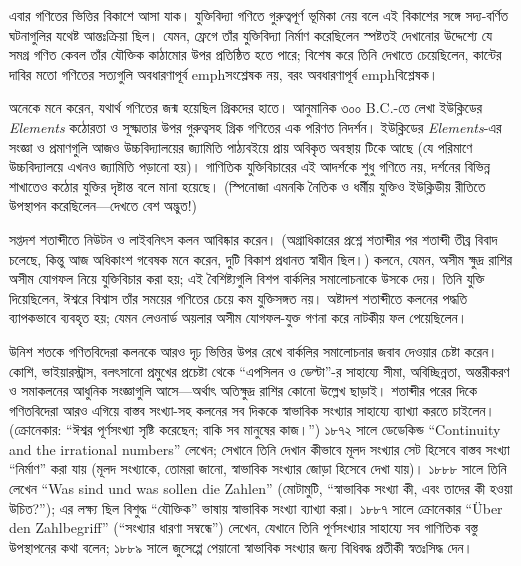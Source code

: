 \documentclass[../../../include/open-logic-section]{subfiles}
\begin{document}
এবার গণিতের ভিত্তির বিকাশে আসা যাক। যুক্তিবিদ্যা গণিতে গুরুত্বপূর্ণ ভূমিকা
নেয় বলে এই বিকাশের সঙ্গে সদ্য-বর্ণিত ঘটনাগুলির যথেষ্ট আন্তঃক্রিয়া ছিল। যেমন,
ফ্রেগে তাঁর যুক্তিবিদ্যা নির্মাণ করেছিলেন স্পষ্টতই দেখানোর উদ্দেশ্যে যে সমগ্র
গণিত কেবল তাঁর যৌক্তিক কাঠামোর উপর প্রতিষ্ঠিত হতে পারে; বিশেষ করে তিনি দেখাতে
চেয়েছিলেন, কান্টের দাবির মতো গণিতের সত্যগুলি অবধারণাপূর্ব emph{সংশ্লেষক}
নয়, বরং অবধারণাপূর্ব emph{বিশ্লেষক}।

অনেকে মনে করেন, যথার্থ গণিতের জন্ম হয়েছিল গ্রিকদের হাতে। আনুমানিক ৩০০
B.C.-তে লেখা ইউক্লিডের \emph{Elements} কঠোরতা ও সূক্ষ্মতার উপর গুরুত্বসহ
গ্রিক গণিতের এক পরিণত নিদর্শন। ইউক্লিডের \emph{Elements}-এর সংজ্ঞা ও
প্রমাণগুলি আজও উচ্চবিদ্যালয়ের জ্যামিতি পাঠ্যবইয়ে প্রায় অবিকৃত অবস্থায় টিকে
আছে (যে পরিমাণে উচ্চবিদ্যালয়ে এখনও জ্যামিতি পড়ানো হয়)। গাণিতিক যুক্তিবিচারের
এই আদর্শকে শুধু গণিতে নয়, দর্শনের বিভিন্ন শাখাতেও কঠোর যুক্তির দৃষ্টান্ত বলে
মানা হয়েছে। (স্পিনোজা এমনকি নৈতিক ও ধর্মীয় যুক্তিও ইউক্লিডীয় রীতিতে
উপস্থাপন করেছিলেন—দেখতে বেশ অদ্ভুত!)

সপ্তদশ শতাব্দীতে নিউটন ও লাইবনিৎস কলন আবিষ্কার করেন। (অগ্রাধিকারের প্রশ্নে
শতাব্দীর পর শতাব্দী তীব্র বিবাদ চলেছে, কিন্তু আজ অধিকাংশ গবেষক মনে করেন,
দুটি বিকাশ প্রধানত স্বাধীন ছিল।) কলনে, যেমন, অসীম ক্ষুদ্র রাশির অসীম যোগফল
নিয়ে যুক্তিবিচার করা হয়; এই বৈশিষ্ট্যগুলি বিশপ বার্কলির সমালোচনাকে উসকে দেয়।
তিনি যুক্তি দিয়েছিলেন, ঈশ্বরে বিশ্বাস তাঁর সময়ের গণিতের চেয়ে কম যুক্তিসঙ্গত
নয়। অষ্টাদশ শতাব্দীতে কলনের পদ্ধতি ব্যাপকভাবে ব্যবহৃত হয়; যেমন লেওনার্ড
অয়লার অসীম যোগফল-যুক্ত গণনা করে নাটকীয় ফল পেয়েছিলেন।

উনিশ শতকে গণিতবিদেরা কলনকে আরও দৃঢ় ভিত্তির উপর রেখে বার্কলির সমালোচনার
জবাব দেওয়ার চেষ্টা করেন। কোশি, ভাইয়ারস্ট্রাস, বলৎসানো প্রমুখের প্রচেষ্টা থেকে
``এপসিলন ও ডেল্টা''-র সাহায্যে সীমা, অবিচ্ছিন্নতা, অন্তরীকরণ ও সমাকলনের
আধুনিক সংজ্ঞাগুলি আসে—অর্থাৎ অতিক্ষুদ্র রাশির কোনো উল্লেখ ছাড়াই। শতাব্দীর
পরের দিকে গণিতবিদেরা আরও এগিয়ে বাস্তব সংখ্যা-সহ কলনের সব দিককে স্বাভাবিক
সংখ্যার সাহায্যে ব্যাখ্যা করতে চাইলেন। (ক্রোনেকার: ``ঈশ্বর পূর্ণসংখ্যা সৃষ্টি
করেছেন; বাকি সব মানুষের কাজ।'') ১৮৭২ সালে ডেডেকিন্ড ``Continuity and the
irrational numbers'' লেখেন; সেখানে তিনি দেখান কীভাবে মূলদ সংখ্যার সেট হিসেবে
বাস্তব সংখ্যা ``নির্মাণ'' করা যায় (মূলদ সংখ্যাকে, তোমরা জানো, স্বাভাবিক সংখ্যার
জোড়া হিসেবে দেখা যায়)। ১৮৮৮ সালে তিনি লেখেন ``Was sind und was sollen die
Zahlen'' (মোটামুটি, ``স্বাভাবিক সংখ্যা কী, এবং তাদের কী হওয়া উচিত?''); এর লক্ষ্য
ছিল বিশুদ্ধ ``যৌক্তিক'' ভাষায় স্বাভাবিক সংখ্যা ব্যাখ্যা করা। ১৮৮৭ সালে ক্রোনেকার
``\"Uber den Zahlbegriff'' (``সংখ্যার ধারণা সম্বন্ধে'') লেখেন, যেখানে তিনি
পূর্ণসংখ্যার সাহায্যে সব গাণিতিক বস্তু উপস্থাপনের কথা বলেন; ১৮৮৯ সালে জুসেপ্পে
পেয়ানো স্বাভাবিক সংখ্যার জন্য বিধিবদ্ধ প্রতীকী স্বতঃসিদ্ধ দেন।
\end{document}

